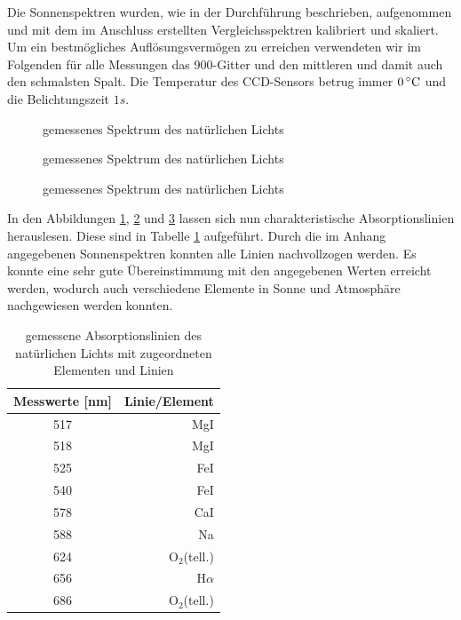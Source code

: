 		Die Sonnenspektren wurden, wie in der Durchführung beschrieben, aufgenommen und mit dem im Anschluss erstellten Vergleichsspektren kalibriert und skaliert.
		Um ein bestmögliches Auflösungsvermögen zu erreichen verwendeten wir im Folgenden für alle Messungen das 900-Gitter und den mittleren und damit auch den schmalsten Spalt.
		Die Temperatur des CCD-Sensors betrug immer $0\, \text{$^\circ$C}$ und die Belichtungszeit $1\unit{s}$.

		\begin{figure}
			\center
			
			\caption{gemessenes Spektrum des natürlichen Lichts}
			\label{sonne-p1}
		\end{figure}

		\begin{figure}
			\center
			
			\caption{gemessenes Spektrum des natürlichen Lichts}
			\label{sonne-p2}
		\end{figure}

		\begin{figure}
			\center
			
			\caption{gemessenes Spektrum des natürlichen Lichts}
			\label{sonne-p3}
		\end{figure}

		In den Abbildungen \ref{sonne-p1}, \ref{sonne-p2} und \ref{sonne-p3} lassen sich nun charakteristische Absorptionslinien herauslesen. 
		Diese sind in Tabelle \ref{tab:sonne-spec} aufgeführt.
		Durch die im Anhang angegebenen Sonnenspektren konnten alle Linien nachvollzogen werden.
		Es konnte eine sehr gute Übereinstimmung mit den angegebenen Werten erreicht werden, wodurch auch verschiedene Elemente in Sonne und Atmosphäre nachgewiesen werden konnten.

		\begin{table}
			\center
			\caption{gemessene Absorptionslinien des natürlichen Lichts mit zugeordneten Elementen und Linien}
			\label{tab:sonne-spec}
			\begin{tabular}{c|r}
				Messwerte [nm] & Linie/Element \\
				\hline
				517 & MgI \\
				518 & MgI \\
				525 & FeI \\
				540 & FeI \\
				578 & CaI \\
				588 & Na \\
				624 & O$_2$(tell.) \\
				656 & H$\alpha$ \\
				686 & O$_2$(tell.)
			\end{tabular}
		\end{table}
	
